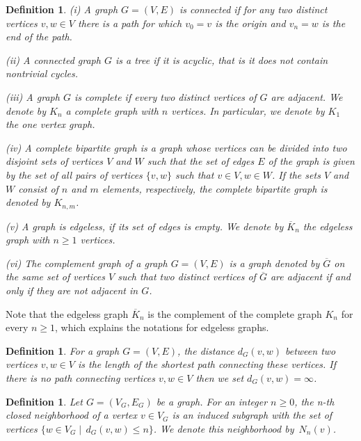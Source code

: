 \documentclass[a4paper, 11pt]{article}
\newtheorem{definition}[theorem]{Definition}
\begin{document}
\begin{definition}\label{d2.5} \rm  (i) A  graph  $G=(V,E)$ is \emph{connected}
if for any two distinct vertices $v, w\in V$ there is a path  for which $v_0=v$ is the  origin and $v_n=w$ is the end of the path.

(ii) A  connected graph $G$ is a \emph{tree} if it is \emph{acyclic},  that is it does not  contain  nontrivial cycles.  

(iii) A graph $G$ is \emph{complete} if  every two distinct vertices of $G$  are adjacent.  We denote by $K_n$ a complete graph with $n$ vertices. In particular, we denote by $K_1$ the one vertex graph.

(iv) A \emph{complete bipartite  graph} is a graph whose vertices can be divided into two disjoint sets of vertices $V$ and $W$ such that the set of edges $E$ of the graph is given by the set of all pairs of vertices $\{v, w\}$ such that $v\in V, w\in W$. If the sets $V$ and $W$  consist of $n$ and $m$ elements, respectively,  the complete bipartite graph is denoted by $K_{n,m}$. 

(v) A graph is {\em edgeless}, if its set of edges is empty. We denote by $\overline K_n$ the edgeless graph with $n\ge 1$ vertices.

(vi)
 The {\em complement graph} of a graph $G=(V,E)$ is a graph denoted by $\overline G$ on the same set of vertices $V$ such that two distinct vertices of $\overline G$  are adjacent if and only if they are not adjacent in $G$. 
\end{definition}

Note that the edgeless graph $\overline K_n$ is the complement of the complete graph $K_n$ for every $n\ge 1$, which explains the notations for edgeless graphs.

\begin{definition}\label{d2.6}\rm For a graph $G=(V,E)$, the \emph{distance} $d_G(v,w)$ between two vertices $v,w\in V$ is the length of the shortest path connecting these vertices.  If there is no path connecting  vertices $v,w\in V$ then we set $d_G(v,w)=\infty$.  
\end{definition}

\begin{definition}\label{d2.7}  \rm  Let $G=(V_G,E_G)$ be a graph. 
For an integer $n\geq 0$, the \emph{n-th closed neighborhood} of a vertex $v\in V_G$ is an induced subgraph with the set of vertices $\{w\in V_G\;|\; \, d_G(v,w)\leq n\}$. We denote this neighborhood by~$N_n(v)$. 

\end{definition}
\end{document}
